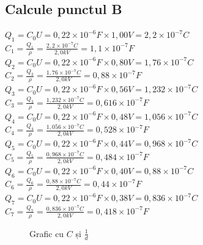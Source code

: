 \documentclass[12pt]{article}
\begin{document}
\subsection{Calcule punctul B}
$Q_{1} = C_{0}U = 0,22 \times 10^{-6}F \times 1,00V = 2,2 \times 10^{-7}C$\\
$C_{1} = \frac{Q_{1}}{\rho} = \frac{2,2 \times 10^{-7}C}{2,0kV} = 1,1 \times 10^{-7}F$\\
$Q_{2} = C_{0}U = 0,22 \times 10^{-6}F \times 0,80V = 1,76 \times 10^{-7}C$\\
$C_{2} = \frac{Q_{2}}{\rho} = \frac{1,76 \times 10^{-7}C}{2,0kV} = 0,88 \times 10^{-7}F$\\
$Q_{3} = C_{0}U = 0,22 \times 10^{-6}F \times 0,56V = 1,232 \times 10^{-7}C$\\
$C_{3} = \frac{Q_{3}}{\rho} = \frac{1,232 \times 10^{-7}C}{2,0kV} = 0,616 \times 10^{-7}F$\\
$Q_{4} = C_{0}U = 0,22 \times 10^{-6}F \times 0,48V = 1,056 \times 10^{-7}C$\\
$C_{4} = \frac{Q_{4}}{\rho} = \frac{1,056 \times 10^{-7}C}{2,0kV} = 0,528 \times 10^{-7}F$\\
$Q_{5} = C_{0}U = 0,22 \times 10^{-6}F \times 0,44V = 0,968 \times 10^{-7}C$\\
$C_{5} = \frac{Q_{5}}{\rho} = \frac{0,968 \times 10^{-7}C}{2,0kV} = 0,484 \times 10^{-7}F$\\
$Q_{6} = C_{0}U = 0,22 \times 10^{-6}F \times 0,40V = 0,88 \times 10^{-7}C$\\
$C_{6} = \frac{Q_{6}}{\rho} = \frac{0,88 \times 10^{-7}C}{2,0kV} = 0,44 \times 10^{-7}F$\\
$Q_{7} = C_{0}U = 0,22 \times 10^{-6}F \times 0,38V = 0,836 \times 10^{-7}C$\\
$C_{7} = \frac{Q_{7}}{\rho} = \frac{0,836 \times 10^{-7}C}{2,0kV} = 0,418 \times 10^{-7}F$\\

\begin{figure}[H]
    \centering
    \caption{Grafic cu $C$ și $\frac{1}{d}$}
    \label{fig:C_vs_1_d}
\end{figure}
\end{document}
